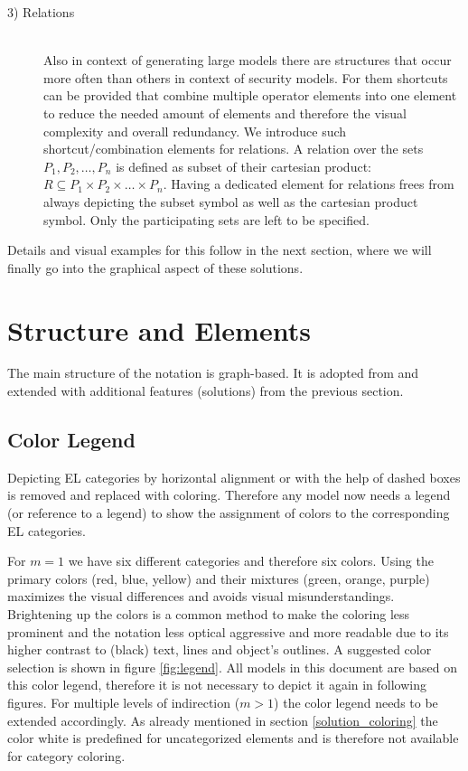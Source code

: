 \documentclass[twoside, openright, 12pt]{book}
\begin{document}
\begin{description}
\item[3) Relations]\hfill \\
Also in context of generating large models there are structures that occur more often than others in context of security models.
For them shortcuts can be provided that combine multiple operator elements into one element to reduce the needed amount of elements and therefore the visual complexity and overall redundancy.
We introduce such shortcut/combination elements for relations.
A relation over the sets $P_1, P_2, \dots, P_n$ is defined as subset of their cartesian product: 
$R \subseteq P_1 \times P_2 \times \dots \times P_n$.
Having a dedicated element for relations frees from always depicting the subset symbol as well as the cartesian product symbol.
Only the participating sets are left to be specified.
\end{description}

\noindent
Details and visual examples for this follow in the next section, where we will finally go into the graphical aspect of these solutions.



\section{Structure and Elements}
\label{gsl_elements}
The main structure of the notation is graph-based.
It is adopted from \cite{Amthor18} and extended with additional features (solutions) from the previous section.



\subsection{Color Legend}
Depicting EL categories by horizontal alignment or with the help of dashed boxes is removed and replaced with coloring.
Therefore any model now needs a legend (or reference to a legend) to show the assignment of colors to the corresponding EL categories.

For $m=1$ we have six different categories and therefore six colors.
Using the primary colors (red, blue, yellow) and their mixtures (green, orange, purple) maximizes the visual differences and avoids visual misunderstandings.
Brightening up the colors is a common method to make the coloring less prominent and the notation less optical aggressive and more readable due to its higher contrast to (black) text, lines and object's outlines.
A suggested color selection is shown in figure \ref{fig:legend}.
All models in this document are based on this color legend, therefore it is not necessary to depict it again in following figures.
For multiple levels of indirection ($m>1$) the color legend needs to be extended accordingly.
As already mentioned in section \ref{solution_coloring} the color white is predefined for uncategorized elements and is therefore not available for category coloring.
\end{document}
